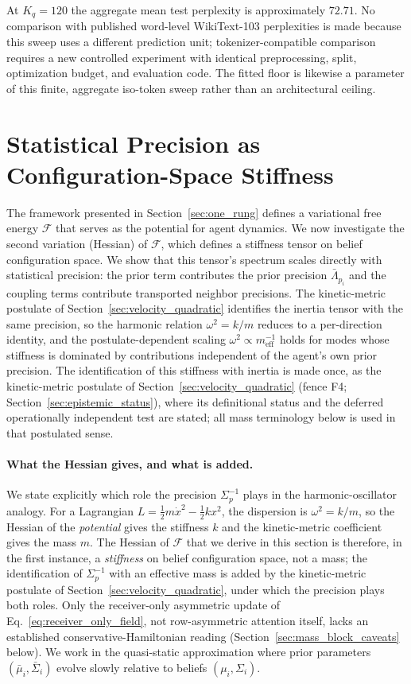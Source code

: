\documentclass[11pt]{article}
\begin{document}
At $K_q=120$ the aggregate mean test perplexity is approximately $72.71$. No comparison with published word-level WikiText-103 perplexities is made because this sweep uses a different prediction unit; tokenizer-compatible comparison requires a new controlled experiment with identical preprocessing, split, optimization budget, and evaluation code. The fitted floor is likewise a parameter of this finite, aggregate iso-token sweep rather than an architectural ceiling.

\section{Statistical Precision as Configuration-Space Stiffness}\label{sec:mass}

The framework presented in Section~\ref{sec:one_rung} defines a variational free energy $\mathcal{F}$ that serves as the potential for agent dynamics. We now investigate the second variation (Hessian) of $\mathcal{F}$, which defines a stiffness tensor on belief configuration space. We show that this tensor's spectrum scales directly with statistical precision: the prior term contributes the prior precision $\bar{\Lambda}_{p_i}$ and the coupling terms contribute transported neighbor precisions. The kinetic-metric postulate of Section~\ref{sec:velocity_quadratic} identifies the inertia tensor with the same precision, so the harmonic relation $\omega^2 = k/m$ reduces to a per-direction identity, and the postulate-dependent scaling $\omega^2 \propto m_{\text{eff}}^{-1}$ holds for modes whose stiffness is dominated by contributions independent of the agent's own prior precision. The identification of this stiffness with inertia is made once, as the kinetic-metric postulate of Section~\ref{sec:velocity_quadratic} (fence F4; Section~\ref{sec:epistemic_status}), where its definitional status and the deferred operationally independent test are stated; all mass terminology below is used in that postulated sense.

\paragraph{What the Hessian gives, and what is added.} We state explicitly which role the precision $\Sigma_p^{-1}$ plays in the harmonic-oscillator analogy. For a Lagrangian $L = \tfrac12 m \dot{x}^2 - \tfrac12 k x^2$, the dispersion is $\omega^2 = k/m$, so the Hessian of the \emph{potential} gives the stiffness $k$ and the kinetic-metric coefficient gives the mass $m$. The Hessian of $\mathcal{F}$ that we derive in this section is therefore, in the first instance, a \emph{stiffness} on belief configuration space, not a mass; the identification of $\Sigma_p^{-1}$ with an effective mass is added by the kinetic-metric postulate of Section~\ref{sec:velocity_quadratic}, under which the precision plays both roles. Only the receiver-only asymmetric update of Eq.~\eqref{eq:receiver_only_field}, not row-asymmetric attention itself, lacks an established conservative-Hamiltonian reading (Section~\ref{sec:mass_block_caveats} below). We work in the quasi-static approximation where prior parameters $(\bar{\mu}_i, \bar{\Sigma}_i)$ evolve slowly relative to beliefs $(\mu_i, \Sigma_i)$.
\end{document}
